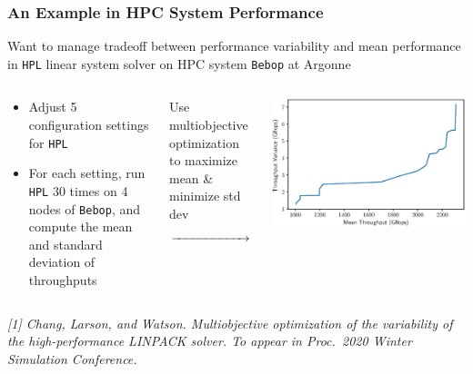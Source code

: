 \documentclass[aspectratio=169]{beamer}
\begin{document}
\begin{frame}\frametitle{An Example in HPC System Performance}
Want to manage tradeoff between performance variability and mean
performance in {\tt HPL} linear system solver on HPC system {\tt Bebop} 
at Argonne
{\small
\begin{columns}
\begin{column}{.3\textwidth}
\begin{itemize}
\item Adjust 5 configuration settings for {\tt HPL}
\item For each setting, run {\tt HPL} 30 times on 4 nodes of {\tt Bebop},
and compute the mean and standard deviation of throughputs
\end{itemize}
\end{column}
\begin{column}{.2\textwidth}
\begin{center}
Use multiobjective optimization to maximize mean
\& minimize std dev
$$\xrightarrow{\hspace*{2cm}}$$
\end{center}
\end{column}
\begin{column}{.4\textwidth}
\includegraphics[width=\textwidth]{hpl_n20k_pf.eps}
\end{column}
\end{columns}
}
\medskip
{\tiny\it
[1] Chang, Larson, and Watson.
Multiobjective optimization of the variability of the high-performance 
LINPACK solver.
To appear in Proc.\ 2020 Winter Simulation Conference.\\
}
\end{frame}
\end{document}
